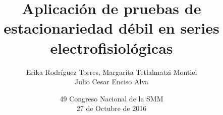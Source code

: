 \documentclass{beamer}
\title[Pruebas de estacionariedad en series electrofisiol\'ogicas]
{Aplicaci\'on de pruebas de estacionariedad d\'ebil en series electrofisiol\'ogicas}
\author[Enciso Alva $\lvert$ Rodr\'iguez Torres $\lvert$ Tetlalmatzi Montiel]
{Erika Rodr\'iguez Torres, Margarita Tetlalmatzi Montiel \\ Julio Cesar Enciso Alva}
\institute[UAEH]
{Universidad Aut\'onoma del Estado de Hidalgo}
\date[Octubre 2016]
{49 Congreso Nacional de la SMM\\ 27 de Octubre de 2016}
\theoremstyle{definition}
\begin{document}
\frame{\titlepage}

\begin{frame}
\tableofcontents
\end{frame}

%
%
%
%

%
%
\end{document}
